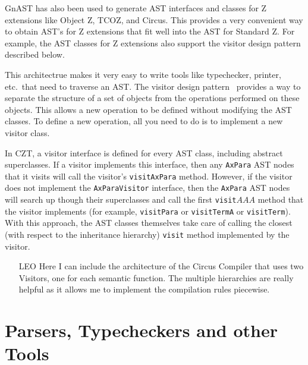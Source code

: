 \documentclass{llncs}
\newcommand{\Interface}[1]{\texttt{#1}}
\newcommand{\Method}[1]{\texttt{#1}}
\begin{document}
  GnAST has also been used to generate AST interfaces and classes for
  Z extensions like Object Z, TCOZ, and Circus.  This provides a very
  convenient way to obtain AST's for Z extensions that fit well into
  the AST for Standard Z.  For example, the AST classes for Z
  extensions also support the visitor design pattern described below.

  This architectrue makes it very easy to write tools like
  typechecker, printer, etc.\ that need to traverse an AST.  The
  visitor design pattern~\cite{GamEA:95,MaiCha:01} provides a way to
  separate the structure of a set of objects from the operations
  performed on these objects.  This allows a new operation to be
  defined without modifying the AST classes.  To define a new
  operation, all you need to do is to implement a new visitor class.

  In CZT, a visitor interface is defined for every AST class,
  including abstract superclasses.  If a visitor implements this
  interface, then any \Interface{AxPara} AST nodes that it visits will
  call the visitor's \Method{visitAxPara} method.  However, if the
  visitor does not implement the \Interface{AxParaVisitor} interface,
  then the \Interface{AxPara} AST nodes will search up though their
  superclasses and call the first \Method{visit$AAA$} method that the
  visitor implements (for example, \Interface{visitPara} or
  \Interface{visitTermA} or \Interface{visitTerm}).  With this
  approach, the AST classes themselves take care of calling the
  closest (with respect to the inheritance hierarchy) \Method{visit}
  method implemented by the visitor.

  \begin{itemize}
    \item[LEO] Here I can include the architecture of the Circus
      Compiler that uses two Visitors, one for each semantic function.
      The multiple hierarchies are really helpful as it allows me to
      implement the compilation rules piecewise.
  \end{itemize}

\section{Parsers, Typecheckers and other Tools}
\end{document}
